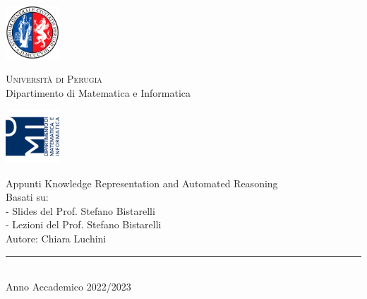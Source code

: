 
\thispagestyle{empty} %

	\noindent %
	\includegraphics[width=0.15\textwidth]{img/logoUniPg}
	\begin{minipage}[b]{0.7\textwidth}
		\centering
		{\Large{\textsc{Universit{\`a} di Perugia}}}\\
		\vspace{0.4 em}
		{\large {Dipartimento di Matematica e Informatica}}
		\vspace{0.6 em}
	\end{minipage}%
	\includegraphics[width=0.15\textwidth]{img/logoDMI}
	
	\vspace{8 em}

	\begin{center}
		

	
		{\Huge{Appunti Knowledge Representation and Automated Reasoning }}\\
		\vspace{5 em}
		{\large {Basati su:}}\\
		{\large {- Slides del Prof. Stefano Bistarelli}}\\
		{\large {- Lezioni del Prof. Stefano Bistarelli}}\\
		\vspace{2 em}
		{\large {Autore: Chiara Luchini}}\\
		
		\vspace{6 em}
		\vfill
		
	{\rule{380pt}{.4pt}}\\
		\vspace{1.2 em}
		\large{{Anno Accademico 2022/2023}}
		
		
		
		
	\end{center}

